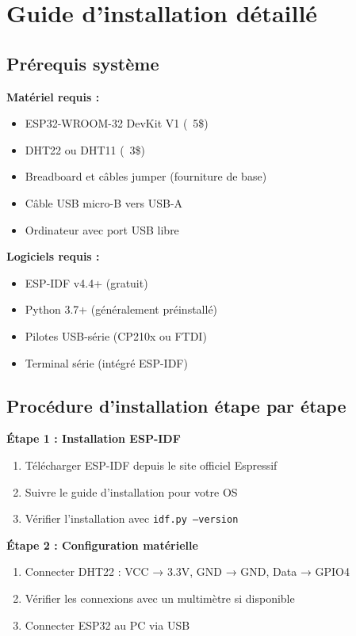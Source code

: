 \section{Guide d'installation détaillé}
\label{app:installation-guide}

\subsection{Prérequis système}

\textbf{Matériel requis :}
\begin{itemize}
    \item ESP32-WROOM-32 DevKit V1 (~5\$)
    \item DHT22 ou DHT11 (~3\$)
    \item Breadboard et câbles jumper (fourniture de base)
    \item Câble USB micro-B vers USB-A
    \item Ordinateur avec port USB libre
\end{itemize}

\textbf{Logiciels requis :}
\begin{itemize}
    \item ESP-IDF v4.4+ (gratuit)
    \item Python 3.7+ (généralement préinstallé)
    \item Pilotes USB-série (CP210x ou FTDI)
    \item Terminal série (intégré ESP-IDF)
\end{itemize}

\subsection{Procédure d'installation étape par étape}

\textbf{Étape 1 : Installation ESP-IDF}
\begin{enumerate}
    \item Télécharger ESP-IDF depuis le site officiel Espressif
    \item Suivre le guide d'installation pour votre OS
    \item Vérifier l'installation avec \texttt{idf.py --version}
\end{enumerate}

\textbf{Étape 2 : Configuration matérielle}
\begin{enumerate}
    \item Connecter DHT22 : VCC → 3.3V, GND → GND, Data → GPIO4
    \item Vérifier les connexions avec un multimètre si disponible
    \item Connecter ESP32 au PC via USB
\end{enumerate}

